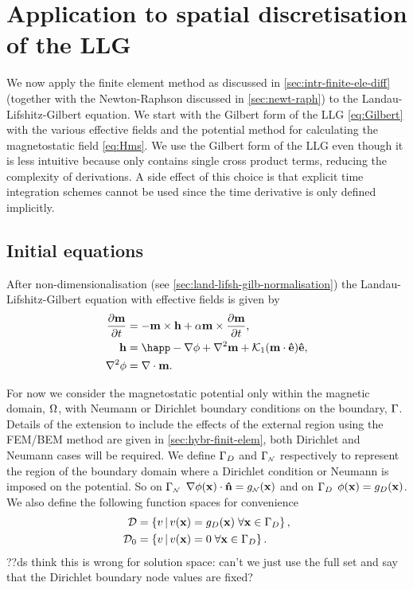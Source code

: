 \section{Application to spatial discretisation of the LLG}
\label{sec:llg-initial-equations}

We now apply the finite element method as discussed in \cref{sec:intr-finite-ele-diff} (together with the Newton-Raphson discussed in \cref{sec:newt-raph}) to the Landau-Lifshitz-Gilbert equation.
We start with the Gilbert form of the LLG \cref{eq:Gilbert} with the various effective fields and the potential method for calculating the magnetostatic field \cref{eq:Hms}.
We use the Gilbert form of the LLG even though it is less intuitive because only contains single cross product terms, reducing the complexity of derivations.
A side effect of this choice is that explicit time integration schemes cannot be used since the time derivative is only defined implicitly.

\subsection{Initial equations}

After non-dimensionalisation (see \cref{sec:land-lifsh-gilb-normalisation}) the Landau-Lifshitz-Gilbert equation with effective fields is given by
\begin{equation}
  \begin{aligned}
    \dmdt &= - \mv \times \hv + \alpha \mv \times \dmdt, \\
    \hv &= \happ - \nabla \phim + \lap \mv + \kone (\mv \cdot \ev) \ev, \\
    \lap \phim &= \div \mv.
    \label{eqn:ndllg-starting}
  \end{aligned}
\end{equation}

For now we consider the magnetostatic potential only within the magnetic domain, $\Omega$, with Neumann or Dirichlet boundary conditions on the boundary, ${\Gamma}$. 
Details of the extension to include the effects of the external region using the FEM/BEM method are given in \cref{sec:hybr-finit-elem}, both Dirichlet and Neumann cases will be required.
We define ${\Gamma}_D$ and ${\Gamma}_{\scriptscriptstyle{\mathcal{N}}}$ respectively to represent the region of the boundary domain where a Dirichlet condition or Neumann is imposed on the potential.
So on ${\Gamma}_{\scriptscriptstyle{\mathcal{N}}}$ $\nabla \phi(\mathbf{x}) \cdot \mathbf{\hat{n}} = g_{\scriptscriptstyle{\mathcal{N}}}(\mathbf{x})$ and on ${\Gamma}_D$ $\phi(\mathbf{x}) = g_D(\mathbf{x})$.
We also define the following function spaces for convenience
\begin{equation}
\begin{aligned}
  \label{eq:037}
  \mathcal{D} & = \left\{ { v \,|\, v(\mathbf{x}) = g_D(\mathbf{x}) \; \forall \mathbf{x} \in {\Gamma}_D } \right\}, \\
  \mathcal{D}_0 &= \left\{ { v \,|\, v(\mathbf{x}) = 0 \; \forall \mathbf{x} \in {\Gamma}_D } \right\}.
\end{aligned}
\end{equation}
??ds think this is wrong for solution space: can't we just use the full set and say that the Dirichlet boundary node values are fixed? 

